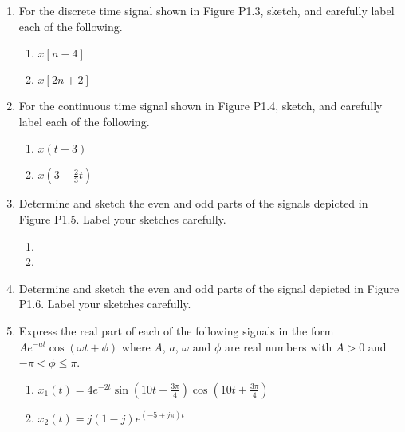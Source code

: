 \begin{enumerate}
  \item For the discrete time signal shown in Figure P1.3, sketch, and carefully label each of the following.

    \begin{enumerate}

      \item $x[n-4]$

      \item $x[2n+2]$

    \end{enumerate}

  \item For the continuous time signal shown in Figure P1.4, sketch, and carefully label each of the following.

    \begin{enumerate}

      \item $x(t+3)$

      \item $x\left( 3-\frac{2}{3}t \right)$

    \end{enumerate}

  \item Determine and sketch the even and odd parts of the signals depicted in Figure P1.5. Label your sketches carefully.

    \begin{enumerate}

      \item 

      \item 

    \end{enumerate}

  \item Determine and sketch the even and odd parts of the signal depicted in Figure P1.6. Label your sketches carefully.

  \item Express the real part of each of the following signals in the form $Ae^{-at}\cos(\omega t + \phi)$ where $A$, $a$, $\omega$ and $\phi$ are real numbers with $A > 0$ and $-\pi < \phi \leq \pi$.

    \begin{enumerate}

      \item $x_1(t)=4e^{-2t}\sin\left( 10t+\frac{3\pi}{4}\right)\cos\left( 10t+\frac{3\pi}{4} \right)$

      \item $x_2(t)=j(1-j)e^{(-5+j\pi)t}$


\end{enumerate}
\end{enumerate}
